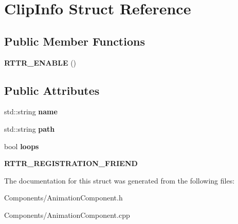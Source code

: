 \hypertarget{structClipInfo}{}\section{Clip\+Info Struct Reference}
\label{structClipInfo}
\subsection*{Public Member Functions}
\begin{DoxyCompactItemize}
\item 
\mbox{\label{structClipInfo_a81cb0f8c29b822520bc9d3b6aaaf31de}} 
{\bfseries R\+T\+T\+R\+\_\+\+E\+N\+A\+B\+LE} ()
\end{DoxyCompactItemize}
\subsection*{Public Attributes}
\begin{DoxyCompactItemize}
\item 
\mbox{\label{structClipInfo_afd5ffbc541b7d16140e3363c689b4c49}} 
std\+::string {\bfseries name}
\item 
\mbox{\label{structClipInfo_a1552b48f64dcbc1e31dbb63e4db8366a}} 
std\+::string {\bfseries path}
\item 
\mbox{\label{structClipInfo_aeacd9bb55941fe62d2da4802510856ae}} 
bool {\bfseries loops}
\item 
\mbox{\label{structClipInfo_aee66f2e0a2e4c01f0ede2b3ac7b65b26}} 
{\bfseries R\+T\+T\+R\+\_\+\+R\+E\+G\+I\+S\+T\+R\+A\+T\+I\+O\+N\+\_\+\+F\+R\+I\+E\+ND}
\end{DoxyCompactItemize}


The documentation for this struct was generated from the following files\+:\begin{DoxyCompactItemize}
\item 
Components/Animation\+Component.\+h\item 
Components/Animation\+Component.\+cpp\end{DoxyCompactItemize}
